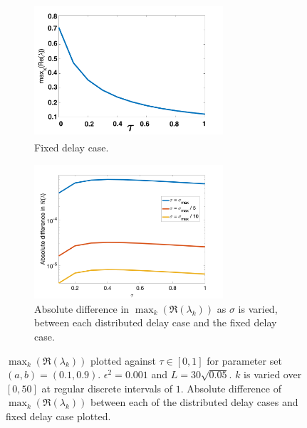 \begin{figure}[H]
    \centering
    \begin{subfigure}[b]{0.45\textwidth}
        \centering
        \includegraphics[width=7cm,height=5cm]{p2fixed.png}
        \caption{Fixed delay case.}
        \label{}
    \end{subfigure}
    \hfill
    \begin{subfigure}[b]{0.45\textwidth}
        \centering
        \includegraphics[width=7cm,height=5cm]{dispdiff1.png}
        \caption{Absolute difference in $\max_k(\Re(\lambda_k))$ as $\sigma$ is varied, between each distributed delay case and the fixed delay case.}
        \label{}
    \end{subfigure}
    \caption{$\max_k(\Re(\lambda_k))$ plotted against $\tau\in[0,1]$ for parameter set $(a,b)=(0.1,0.9)$. $\epsilon^2=0.001$ and $L=30\sqrt{0.05}$. $k$ is varied over $[0,50]$ at regular discrete intervals of $1$. Absolute difference of $\max_k(\Re(\lambda_k))$ between each of the distributed delay cases and fixed delay case plotted.}
    \label{fig:p2}
\end{figure}
